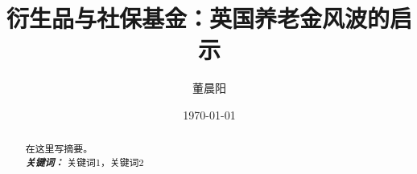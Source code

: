 \documentclass[a4paper,12pt]{ctexart}
\title{衍生品与社保基金：英国养老金风波的启示}
\author{董晨阳}
\date{\today}
\providecommand{\keywords}[1]{\\\textbf{\textit{关键词：}} #1}
\begin{document}
\maketitle
\begin{abstract}
在这里写摘要。
\keywords{关键词1，关键词2}
\end{abstract}
\clearpage
\printbibliography[heading=bibliography,title=参考文献]
\end{document}
